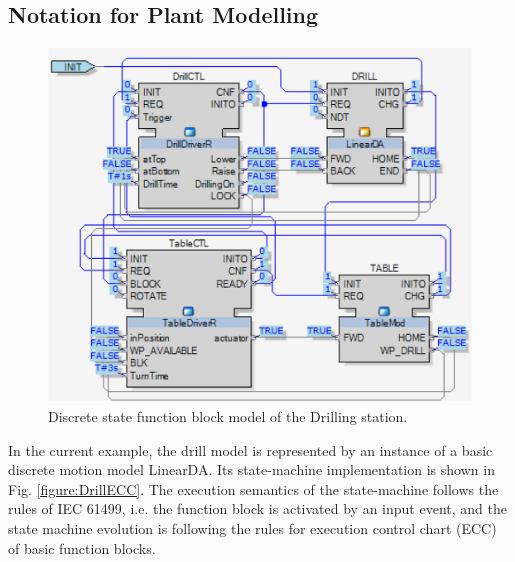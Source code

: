 \begin{bibunit}
\subsection{Notation for Plant Modelling}


\begin{figure}
    \centering
    \includegraphics[scale = 0.65]{MX_Papers/Paper2/images/VerificationFB.png}
    \caption{Discrete state function block model of the Drilling station. }
    \label{figure:FBver}
\end{figure}

In the current example, the drill model is represented by an instance of a basic discrete motion model LinearDA. 
Its state-machine implementation is shown in Fig. \ref{figure:DrillECC}. The execution semantics of the state-machine follows the rules of IEC 61499, i.e. the function block is activated by an input event, and the state machine evolution is following the rules for execution control chart (ECC) of basic function blocks. 


\end{bibunit}
